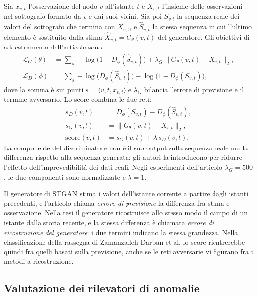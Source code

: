 Sia $x_{v,t}$ l'osservazione del nodo $v$ all'istante $t$ e $X_{v,t}$ l'insieme delle osservazioni nel sottografo formato da $v$ e dai suoi vicini. Sia poi $S_{v,t}$ la sequenza reale dei valori del sottografo che termina con $X_{v,t}$, e $\hat{S}_{v,t}$ la stessa sequenza in cui l'ultimo elemento è sostituito dalla stima $\hat{X}_{v,t}=G_{\theta}(v,t)$ del generatore. Gli obiettivi di addestramento dell'articolo sono
\begin{align}
    \mathcal{L}_G(\theta) &= \sum_{s} -\log\bigl(1-D_{\phi}(\hat{S}_{v,t})\bigr) + \lambda_G\,\lVert G_{\theta}(v,t)-X_{v,t}\rVert_2, \label{eq:stgan-loss-g}\\
    \mathcal{L}_D(\phi) &= \sum_{s} -\log\bigl(D_{\phi}(\hat{S}_{v,t})\bigr) - \log\bigl(1-D_{\phi}(S_{v,t})\bigr), \label{eq:stgan-loss-d}
\end{align}
dove la somma è sui punti $s=\langle v,t,x_{v,t}\rangle$ e $\lambda_G$ bilancia l'errore di previsione e il termine avversario. Lo score combina le due reti:
\begin{align}
    s_D(v,t) &= D_{\phi}(S_{v,t}) - D_{\phi}(\hat{S}_{v,t}), \nonumber\\
    s_G(v,t) &= \lVert G_{\theta}(v,t)-X_{v,t}\rVert_2, \nonumber\\
    \mathrm{score}(v,t) &= s_G(v,t) + \lambda\, s_D(v,t). \label{eq:stgan-score}
\end{align}
La componente del discriminatore non è il suo output sulla sequenza reale ma la differenza rispetto alla sequenza generata: gli autori la introducono per ridurre l'effetto dell'imprevedibilità dei dati reali. Negli esperimenti dell'articolo $\lambda_G=500$, le due componenti sono normalizzate e $\lambda=1$.

Il generatore di STGAN stima i valori dell'istante corrente a partire dagli istanti precedenti, e l'articolo chiama \emph{errore di previsione} la differenza fra stima e osservazione. Nella tesi il generatore ricostruisce allo stesso modo il campo di un istante dalla storia recente, e la stessa differenza è chiamata \emph{errore di ricostruzione del generatore}: i due termini indicano la stessa grandezza. Nella classificazione della rassegna di Zamanzadeh Darban et al. lo score rientrerebbe quindi fra quelli basati sulla previsione, anche se le reti avversarie vi figurano fra i metodi a ricostruzione.

\subsection{Valutazione dei rilevatori di anomalie}
\label{sec:rw-valutazione}


